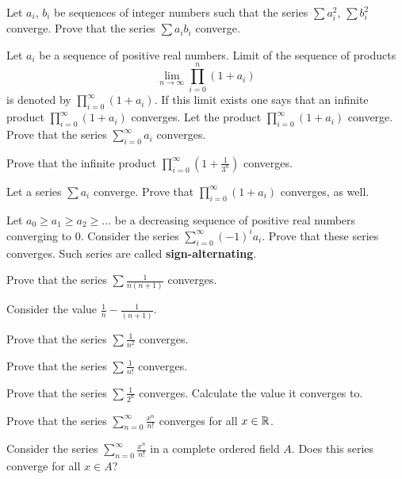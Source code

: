\documentclass[12pt]{article}
\begin{document}
\begin{zadacha}[**] Let $a_i$, $b_i$ be sequences of integer numbers
  such that the series $\sum a_i^2$, $\sum b_i^2$ converge. Prove that
  the series $\sum a_ib_i$ converge.
\end{zadacha}

\begin{zadacha}[*] Let $a_i$ be a sequence of positive real
  numbers. Limit of the sequence of products
$$
\lim_{n\to \infty} \prod^n_{i=0} (1+a_i)
$$
is denoted by $\prod^\infty_{i=0} (1+a_i)$. If this limit exists one
says that an infinite product $\prod^\infty_{i=0} (1+a_i)$ converges.
Let the product $\prod^\infty_{i=0} (1+a_i)$ converge. Prove that the series
$\sum^\infty_{i=0} a_i$ converges.
\end{zadacha}

\begin{zadacha}[*] Prove that the infinite product $\prod^\infty_{i=0}
  (1+\frac 1 {3^n})$ converges.
\end{zadacha}

\begin{zadacha}[**] Let a series $\sum a_i$ converge.
Prove that $\prod^\infty_{i=0} (1+a_i)$ converges, as well.
\end{zadacha}

\begin{zadacha}[!] Let $a_0\geq a_1 \geq a_2 \geq \ldots$ be a
  decreasing sequence of positive real numbers converging to
  0. Consider the series $\sum^\infty_{i=0}
(-1)^ia_i$. Prove that these series converges. Such series are called
{\bf sign-alternating}.
\end{zadacha}

\begin{zadacha} Prove that the series $\sum \frac 1{n (n+1)}$
converges.
\end{zadacha}

\begin{ukazanie} Consider the value $\frac{1}{n} - \frac 1{(n+1)}$.
\end{ukazanie}

\begin{zadacha} Prove that the series
$\sum \frac{1}{n^2}$ converges.
\end{zadacha}

\begin{zadacha} Prove that the series $\sum \frac 1{n!}$
converges.
\end{zadacha}

\begin{zadacha}[!] Prove that the series $\sum \frac 1{2^n}$
converges. Calculate the value it converges to.
\end{zadacha}

\begin{zadacha}[*] Prove that the series $\sum_{n=0}^\infty \frac
{x^n}{n!}$ converges for all $x\in {\mathbb R}$.
\end{zadacha}

\begin{zadacha}[**] Consider the series $\sum_{n=0}^\infty \frac
  {x^n}{n!}$ in a complete ordered field $A$. Does this series
  converge for all $x\in A$?
\end{zadacha}
 
\end{document}
